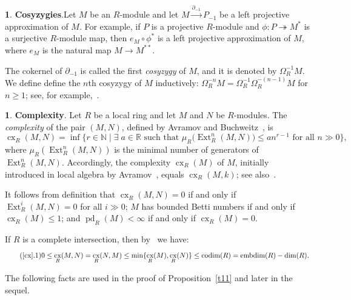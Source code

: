 \documentclass[11pt]{amsart}
\theoremstyle{definition}
\theoremstyle{definition}
\newtheorem{chunk}[thm]{\hspace*{-1.065ex}\bf}
\numberwithin{equation}{section}
\newcommand{\RR}{\mathbb{R}}
\newcommand{\NN}{\mathbb{N}}
\DeclareMathOperator{\cx}{cx}
\DeclareMathOperator{\edim}{embdim}
\DeclareMathOperator{\Ext}{Ext}
\DeclareMathOperator{\pd}{pd}
\DeclareMathOperator{\cod}{codim}
\begin{document}
\begin{chunk} \textbf{Cosyzygies}.\label{cs} Let $M$ be an $R$-module and let $M\overset{\partial_{-1}}{\longrightarrow} P_{-1}$ be a left projective approximation of $M$. For example, if $P$ is a projective $R$-module and $\phi:P\twoheadrightarrow M^*$ is a surjective $R$-module map, then $e_M\circ\phi^*$ is a left projective approximation of $M$, where $e_M$ is the natural map $M\to M^{**}$. 

The cokernel of $\partial_{-1}$ is called the first \emph{cosyzygy} of $M$, and it is denoted by $\Omega_R^{-1}M$. We define define the $n$th cosyzygy 
of $M$ inductively: $\Omega_R^{-n}M= \Omega_R^{-1} \Omega_R^{-(n-1)}M $ for $n\geq 1$; see, for example,~\cite[2.3]{ST2}. 
\end{chunk}

\begin{chunk}\label{cx}\textbf{Complexity}. Let $R$ be a local ring and let $M$ and $N$ be $R$-modules. The \emph{complexity} of the pair $(M,N)$, defined by Avramov and Buchweitz~\cite{AvBu}, is
$$\cx_R(M,N)=\inf\{ r\in\NN \mid \exists\; a \in \RR \text{ such that } \mu_R\big(\Ext^n_R(M,N)\big)\leq a n^{r-1} \text{ for all } n\gg 0\},$$
where  $\mu_R(\Ext^n_R(M,N))$ is the minimal number of generators of $\Ext^n_R(M,N)$. Accordingly, the complexity $\cx_R(M)$ of $M$, initially introduced in local algebra by Avramov~\cite{Av1}, equals $\cx_R(M,k)$; see also~\cite{AGP}. 

It follows from definition that $\cx_R(M,N)=0$ if and only if $\Ext^i_R(M,N)=0$ for all $i\gg0$; $M$ has bounded Betti numbers if and only if $\cx_R(M)\leq1$; and $\pd_R(M)<\infty$ if and only if $\cx_R(M)=0$. 

If $R$ is a complete intersection, then by~\cite[5.7]{AvBu} we have:
\begin{equation}\tag{\ref*{cx}.1} \label{cx.1}
0\leq \cx_R(M,N)=\cx_R(N,M)\leq\min\{\cx_R(M),\cx_R(N)\}\leq\cod(R)=\edim(R)-\dim(R).
\end{equation}
\end{chunk}

The following facts are used in the proof of Proposition~\ref{t11} and later in the sequel.
\end{document}
